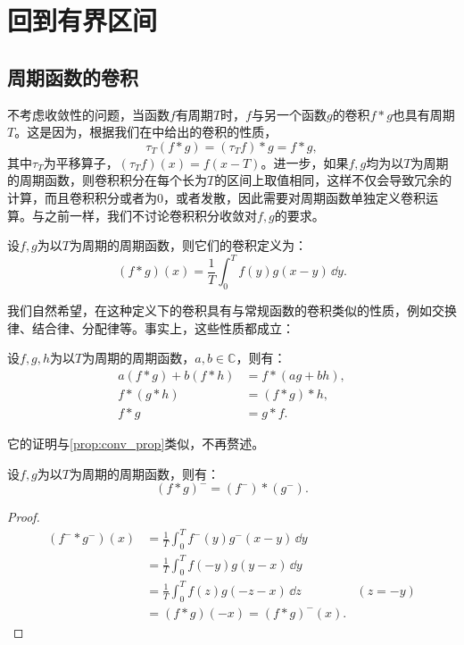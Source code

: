 \section{回到有界区间}\label{sec:Finite_Interval}

\subsection{周期函数的卷积}\label{sub:conv_of_period_func}

不考虑收敛性的问题，当函数$f$有周期$T$时，$f$与另一个函数$g$的卷积$f*g$也具有周期$T$。这是因为，根据我们在中给出的卷积的性质，
\begin{equation}
    \tau_T(f*g)=(\tau_T f)*g=f*g,
\end{equation}
其中$\tau_T$为平移算子，$(\tau_T f)(x)=f(x-T)$。进一步，如果$f,g$均为以$T$为周期的周期函数，则卷积积分在每个长为$T$的区间上取值相同，这样不仅会导致冗余的计算，而且卷积积分或者为$0$，或者发散，因此需要对周期函数单独定义卷积运算。与之前一样，我们不讨论卷积积分收敛对$f,g$的要求。

\begin{definition}[周期函数的卷积]\label{def:period_conv}
    设$f,g$为以$T$为周期的周期函数，则它们的卷积定义为：
    \begin{equation}
        (f*g)(x)=\frac{1}{T}\int_{0}^{T}f(y)g(x-y)\,\dd y.
    \end{equation}
\end{definition}

我们自然希望，在这种定义下的卷积具有与常规函数的卷积类似的性质，例如交换律、结合律、分配律等。事实上，这些性质都成立：
\begin{proposition}
    设$f,g,h$为以$T$为周期的周期函数，$a,b\in\mathbb{C}$，则有：
    \begin{align}
        a(f*g)+b(f*h)&=f*(ag+bh),\\
        f*(g*h)&=(f*g)*h,\\
        f*g&=g*f.
    \end{align}
\end{proposition}
它的证明与\cref{prop:conv_prop}类似，不再赘述。

\begin{proposition}[函数反转]
    设$f,g$为以$T$为周期的周期函数，则有：
    \begin{equation}
        (f*g)^-=(f^-)*(g^-).
    \end{equation}
\end{proposition}
\begin{proof}
    \begin{align}
        (f^-*g^-)(x)&=\frac{1}{T}\int_0^{T}f^-(y)g^-(x-y)\,\dd y\nonumber\\
        &=\frac{1}{T}\int_0^{T}f(-y)g(y-x)\,\dd y\nonumber\\
        &=\frac{1}{T}\int_0^{T}f(z)g(-z-x)\,\dd z&(z=-y)\nonumber\\
        &=(f*g)(-x)=(f*g)^-(x).
    \end{align}
\end{proof}

